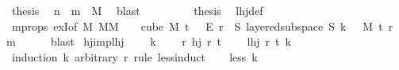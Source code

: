 \begin{isabellebody}
\ {\isacharquery}{\kern0pt}thesis\ \isamarkupfalse%
\ {\isacartoucheopen}n\ {\isacharplus}{\kern0pt}\ m\ {\isacharequal}{\kern0pt}\ M{\isacharprime}{\kern0pt}{\isacartoucheclose}\ \isamarkupfalse%
\ blast\ \isanewline
\ \ \isamarkupfalse%
\isanewline
\ \ \isamarkupfalse%
\ \isamarkupfalse%
\ {\isacharquery}{\kern0pt}thesis\ \isamarkupfalse%
\ lhj{\isacharunderscore}{\kern0pt}def\ \isamarkupfalse%
\ m{\isacharunderscore}{\kern0pt}props\ exI{\isacharbrackleft}{\kern0pt}of\ {\isachardoublequoteopen}{\isasymlambda}M{\isachardot}{\kern0pt}\ {\isasymforall}M{\isacharprime}{\kern0pt}{\isasymge}M{\isachardot}{\kern0pt}\ {\isasymforall}{\isasymchi}{\isachardot}{\kern0pt}\ {\isasymchi}\ {\isasymin}\ cube\ M{\isacharprime}{\kern0pt}\ {\isacharparenleft}{\kern0pt}t\ {\isacharplus}{\kern0pt}\ {}{\isacharparenright}{\kern0pt}\ {\isasymrightarrow}\isactrlsub E\ {\isacharbraceleft}{\kern0pt}{\isachardot}{\kern0pt}{\isachardot}{\kern0pt}{\isacharless}{\kern0pt}r{\isacharbraceright}{\kern0pt}\ {\isasymlongrightarrow}\ {\isacharparenleft}{\kern0pt}{\isasymexists}S{\isachardot}{\kern0pt}\ layered{\isacharunderscore}{\kern0pt}subspace\ S\ {\isacharparenleft}{\kern0pt}k\ {\isacharplus}{\kern0pt}\ {}{\isacharparenright}{\kern0pt}\ M{\isacharprime}{\kern0pt}\ t\ r\ {\isasymchi}{\isacharparenright}{\kern0pt}{\isachardoublequoteclose}\ m{\isacharbrackright}{\kern0pt}\isanewline
\ \ \ \ \isamarkupfalse%
\ blast\isanewline
{}\isamarkupfalse%
%
\endisatagproof
{\isafoldproof}%
%
\isadelimproof
\isanewline
%
\endisadelimproof
\isanewline
{}\isamarkupfalse%
\ hj{\isacharunderscore}{\kern0pt}imp{\isacharunderscore}{\kern0pt}lhj{\isacharcolon}{\kern0pt}\ \isanewline
\ \ \ k\ \isanewline
\ \ \ {\isachardoublequoteopen}{\isasymAnd}r{\isacharprime}{\kern0pt}{\isachardot}{\kern0pt}\ hj\ r{\isacharprime}{\kern0pt}\ t{\isachardoublequoteclose}\ \isanewline
\ \ \ {\isachardoublequoteopen}lhj\ r\ t\ k{\isachardoublequoteclose}\isanewline
%
\isadelimproof
%
\endisadelimproof
%
\isatagproof
{}\isamarkupfalse%
\ {\isacharparenleft}{\kern0pt}induction\ k\ arbitrary{\isacharcolon}{\kern0pt}\ r\ rule{\isacharcolon}{\kern0pt}\ less{\isacharunderscore}{\kern0pt}induct{\isacharparenright}{\kern0pt}\isanewline
\ \ \isamarkupfalse%
\ {\isacharparenleft}{\kern0pt}less\ k{\isacharparenright}{\kern0pt}\isanewline
\ \ \isamarkupfalse%

\end{isabellebody}
